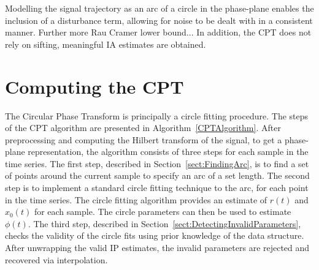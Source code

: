 \documentclass[a4paper]{IEEEtran}
\newcommand{\todo}[1]{\textsf{\emph{\textbf{\textcolor{blue}{#1}}}}}
\begin{document}
Modelling the signal trajectory as an arc of a circle in the phase-plane enables the inclusion of a disturbance term, allowing for noise to be dealt with in a consistent manner. Further more Rau Cramer lower bound... In addition, the CPT does not rely on sifting, meaningful IA estimates are obtained.


\section{Computing the CPT}\label{sect:ComputingCPTSection}

The Circular Phase Transform is principally a circle fitting procedure. The steps of the CPT algorithm are presented in Algorithm~\ref{CPTAlgorithm}. After preprocessing and computing the Hilbert transform of the signal, to get a phase-plane representation, the algorithm consists of three steps for each sample in the time series. 
The first step, described in Section~\ref{sect:FindingArc}, is to find a set of points around the current sample to specify an arc of a set length. The second step is to implement a standard circle fitting technique to the arc, for each point in the time series. The circle fitting algorithm provides an estimate of $r(t)$ and $x_0(t)$ for each sample. The circle parameters can then be used to estimate $\phi(t)$. The third step, described in Section~\ref{sect:DetectingInvalidParameters}, checks the validity of the circle fits using prior knowledge of the data structure. After unwrapping the valid IP estimates, the invalid parameters are rejected and recovered via interpolation. 
\end{document}

